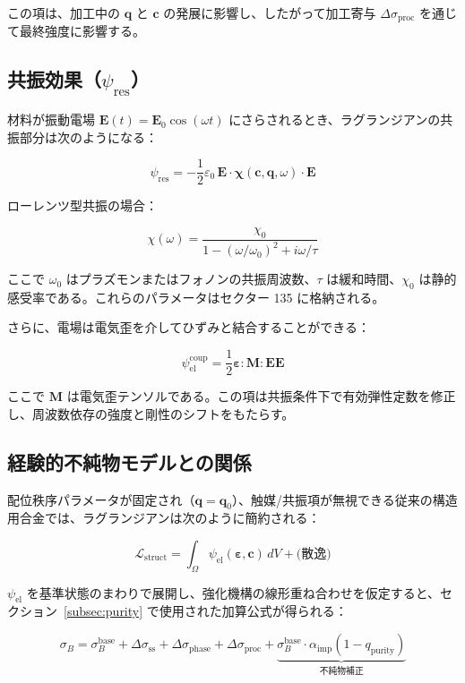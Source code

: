\documentclass[11pt,a4paper]{article}
\theoremstyle{remark}
\begin{document}
	この項は、加工中の \(\mathbf{q}\) と \(\mathbf{c}\) の発展に影響し、したがって加工寄与 \(\Delta\sigma_{\mathrm{proc}}\) を通じて最終強度に影響する。
	
	\subsection{共振効果（\(\psi_{\mathrm{res}}\)）}
	\label{subsec:resonance}
	
	材料が振動電場 \(\mathbf{E}(t) = \mathbf{E}_0 \cos(\omega t)\) にさらされるとき、ラグランジアンの共振部分は次のようになる：
	
	\[
	\psi_{\mathrm{res}} = -\frac{1}{2}\varepsilon_0\, \mathbf{E} \cdot \boldsymbol{\chi}(\mathbf{c}, \mathbf{q}, \omega) \cdot \mathbf{E}
	\]
	
	ローレンツ型共振の場合：
	
	\[
	\chi(\omega) = \frac{\chi_0}{1 - (\omega/\omega_0)^2 + i\omega/\tau}
	\]
	
	ここで \(\omega_0\) はプラズモンまたはフォノンの共振周波数、\(\tau\) は緩和時間、\(\chi_0\) は静的感受率である。これらのパラメータはセクター 135 に格納される。
	
	さらに、電場は電気歪を介してひずみと結合することができる：
	
	\[
	\psi_{\mathrm{el}}^{\mathrm{coup}} = \frac{1}{2} \boldsymbol{\varepsilon} : \mathbf{M} : \mathbf{E}\mathbf{E}
	\]
	
	ここで \(\mathbf{M}\) は電気歪テンソルである。この項は共振条件下で有効弾性定数を修正し、周波数依存の強度と剛性のシフトをもたらす。
	
	\subsection{経験的不純物モデルとの関係}
	\label{subsec:relation-empirical}
	
	配位秩序パラメータが固定され（\(\mathbf{q} = \mathbf{q}_0\)）、触媒/共振項が無視できる従来の構造用合金では、ラグランジアンは次のように簡約される：
	
	\[
	\mathcal{L}_{\mathrm{struct}} = \int_{\Omega} \psi_{\mathrm{el}}(\boldsymbol{\varepsilon}, \mathbf{c}) \, dV + \text{(散逸)}
	\]
	
	\(\psi_{\mathrm{el}}\) を基準状態のまわりで展開し、強化機構の線形重ね合わせを仮定すると、セクション~\ref{subsec:purity} で使用された加算公式が得られる：
	
	\[
	\sigma_B = \sigma_B^{\mathrm{base}} + \Delta\sigma_{\mathrm{ss}} + \Delta\sigma_{\mathrm{phase}} + \Delta\sigma_{\mathrm{proc}} + \underbrace{\sigma_B^{\mathrm{base}} \cdot \alpha_{\mathrm{imp}} (1 - q_{\mathrm{purity}})}_{\text{不純物補正}}
	\]
	
\end{document}
